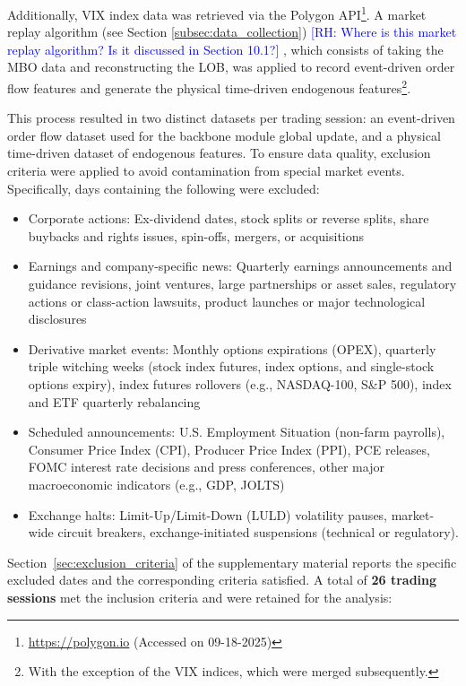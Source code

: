 \documentclass[10pt,a4paper,oneside]{article}
\newcommand{\rh}[1]{\textcolor{blue}{\textsf{[RH: #1]}}}
\providecommand{\DIFaddtex}[1]{{\protect\color{blue} \sf #1}} %
\providecommand{\DIFdeltex}[1]{{\protect\color{red} \scriptsize #1}} %
\providecommand{\DIFaddbegin}{} %
\providecommand{\DIFaddend}{} %
\providecommand{\DIFdelbegin}{} %
\providecommand{\DIFdelend}{} %
\providecommand{\DIFadd}[1]{\texorpdfstring{\DIFaddtex{#1}}{#1}} %
\providecommand{\DIFdel}[1]{\texorpdfstring{\DIFdeltex{#1}}{}} %
\newcommand{\DIFscaledelfig}{0.5}
\newlength{\DIFdelgraphicswidth} %
\newlength{\DIFdelgraphicsheight} %
\newcommand{\DIFaddincludegraphics}[2][]{{\color{blue}\fbox{\DIFOincludegraphics[#1]{#2}}}} %
\newcommand{\DIFdelincludegraphics}[2][]{%
\sbox{\DIFdelgraphicsbox}{\DIFOincludegraphics[#1]{#2}}%
\settoboxwidth{\DIFdelgraphicswidth}{\DIFdelgraphicsbox} %
\settoboxtotalheight{\DIFdelgraphicsheight}{\DIFdelgraphicsbox} %
\scalebox{\DIFscaledelfig}{%
\parbox[b]{\DIFdelgraphicswidth}{\usebox{\DIFdelgraphicsbox}\\[-\baselineskip] \rule{\DIFdelgraphicswidth}{0em}}\llap{\resizebox{\DIFdelgraphicswidth}{\DIFdelgraphicsheight}{%
\setlength{\unitlength}{\DIFdelgraphicswidth}%
\begin{picture}(1,1)%
\thicklines\linethickness{2pt} %
{\color[rgb]{1,0,0}\put(0,0){\framebox(1,1){}}}%
{\color[rgb]{1,0,0}\put(0,0){\line( 1,1){1}}}%
{\color[rgb]{1,0,0}\put(0,1){\line(1,-1){1}}}%
\end{picture}%
}\hspace*{3pt}}} %
} %
\DeclareRobustCommand{\DIFaddbegin}{\DIFOaddbegin \let\includegraphics\DIFaddincludegraphics} %
\DeclareRobustCommand{\DIFaddend}{\DIFOaddend \let\includegraphics\DIFOincludegraphics} %
\DeclareRobustCommand{\DIFdelbegin}{\DIFOdelbegin \let\includegraphics\DIFdelincludegraphics} %
\DeclareRobustCommand{\DIFdelend}{\DIFOaddend \let\includegraphics\DIFOincludegraphics} %
\begin{document}
Additionally, VIX index data was retrieved via the Polygon API\footnote{\url{https://polygon.io} (Accessed on 09-18-2025)}. A market replay algorithm\DIFdelbegin \DIFdel{(see Section \ref{subsec:data_collection}) \rh{Where is this market replay algorithm? Is it discussed in Section 10.1?}}\DIFdelend \DIFaddbegin \DIFadd{, which consists of taking the MBO data and reconstructing the LOB, }\DIFaddend was applied to record event-driven order flow features and generate the physical time-driven endogenous features\footnote{With the exception of the VIX indices, which were merged subsequently.}.

This process resulted in two distinct datasets per trading session: an event-driven order flow dataset used for the backbone module global update, and a physical time-driven dataset of endogenous features. To ensure data quality, exclusion criteria were applied to avoid contamination from special market events. Specifically, days containing the following were excluded:


\begin{itemize}
    \item Corporate actions: Ex-dividend dates, stock splits or reverse splits, share buybacks and rights issues, spin-offs, mergers, or acquisitions
    \item Earnings and company-specific news: Quarterly earnings announcements and guidance revisions, joint ventures, large partnerships or asset sales, regulatory actions or class-action lawsuits, product launches or major technological disclosures
    \item Derivative market events: Monthly options expirations (OPEX), quarterly triple witching weeks (stock index futures, index options, and single-stock options expiry), index futures rollovers (e.g., NASDAQ-100, S\&P 500), index and ETF quarterly rebalancing
    \item Scheduled announcements: U.S. Employment Situation (non-farm payrolls), Consumer Price Index (CPI), Producer Price Index (PPI), PCE releases, FOMC interest rate decisions and press conferences, other major macroeconomic indicators (e.g., GDP, JOLTS)
    \item Exchange halts: Limit-Up/Limit-Down (LULD) volatility pauses, market-wide circuit breakers, exchange-initiated suspensions (technical or regulatory).
\end{itemize}

Section~\ref{sec:exclusion_criteria} of the supplementary material reports the specific excluded dates and the corresponding criteria satisfied. A total of \textbf{26 trading sessions} met the inclusion criteria and were retained for the analysis:
\end{document}
